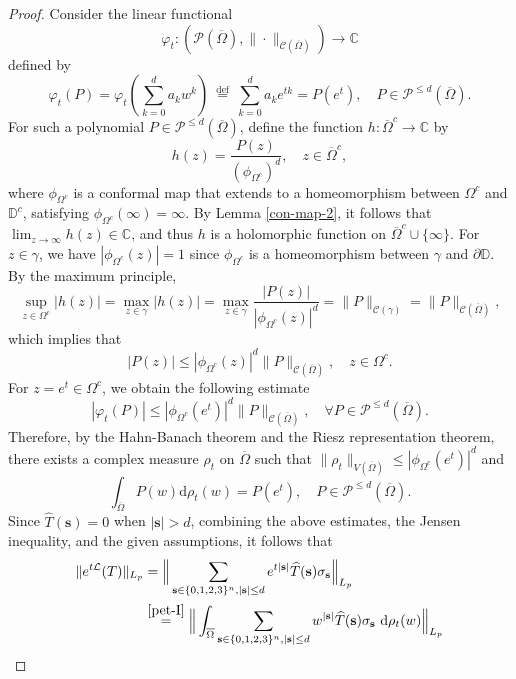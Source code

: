 \documentclass{amsbook}
\theoremstyle{definition}
\theoremstyle{remark}
\numberwithin{section}{chapter}
\numberwithin{equation}{chapter}
\newcommand{\1}{\mathbf{1}}
\begin{document}
\begin{proof} Consider the linear functional
$$\varphi_{t}:(\mathcal{P}(\overline{\Omega}),\|\cdot\|_{\mathcal{C}(\overline{\Omega})}) \rightarrow \mathbb{C}
$$
defined by
$$
\varphi_{t}(P)=\varphi_{t}(\sum_{k=0}^{d} a_{k} w^{k}) \stackrel{\text { def }}{=} \sum_{k=0}^{d} a_{k} e^{t k}=P(e^t),\quad P\in \mathcal{P}^{\leq d}(\overline{\Omega}).
$$
 For such a polynomial $P\in \mathcal{P}^{\leq d}(\overline{\Omega})$, define the function $h:\overline{\Omega}^{c}\rightarrow \mathbb{C}$ by
$$h(z)=\frac{P(z)}{(\phi_{\Omega^c})^d},\quad z\in\overline{\Omega}^{c},$$
where $\phi_{\Omega^{c}}$ is a conformal map that extends to a homeomorphism between $\Omega^{c}$ and $\mathbb{D}^{c}$, satisfying $\phi_{\Omega^{c}}(\infty)=\infty$. By Lemma \ref{con-map-2}, it follows  that $\lim _{z \rightarrow \infty} h(z) \in \mathbb{C}$, and thus $h$ is a holomorphic function on $\overline{\Omega}^{c} \cup\{\infty\}$. For $z \in \gamma$, we have $|\phi_{\Omega^{c}}(z)|=1$ since $\phi_{\Omega^{c}}$ is a homeomorphism between $\gamma$ and $\partial \mathbb{D}$. By the maximum principle,
$$
\sup _{z \in \Omega^{c}}|h(z)|=\max _{z \in \gamma}|h(z)|=\max _{z \in \gamma} \frac{|P(z)|}{|\phi_{\Omega^{c}}(z)|^{d}}=\|P\| _{\mathcal{C}(\gamma)}=\|P\|_{\mathcal{C}(\overline{\Omega})},$$
which implies that 
$$
|P(z)| \leq|\phi_{\Omega^{c}}(z)|^{d}\|P\|_{\mathcal{C}(\overline{\Omega})},\quad z \in \Omega^{c}.
$$
For  $z=e^t\in\Omega^{c}$, we obtain the following estimate
$$
|\varphi_{t}(P)| \leq|\phi_{\Omega^{c}}(e^{t})|^{d}\|P\|_{\mathcal{C}(\overline{\Omega})},\quad \forall P \in \mathcal{P}^{\leq d}(\overline{\Omega}). $$
Therefore, by the Hahn-Banach theorem and the Riesz representation theorem, there exists a complex measure $\rho_{t}$ on $\overline{\Omega}$ such that $\|\rho_{t}\|_{V(\overline{\Omega})} \leq|\phi_{\Omega^{c}}(e^{t})|^{d}$ and
\begin{equation}\label{pet-I}
\int_{\overline{\Omega}} P(w) \mathrm{d}\rho_{t}(w)=P(e^{t}),\quad P \in \mathcal{P}^{\leq d}(\overline{\Omega}). 
\end{equation}
Since $\widehat{T}(\mathbf{s})=0$ when $|\mathbf{s}|>d$, combining the above estimates, the Jensen inequality, and the given assumptions, it follows that
\begin{align*}
\|e^{t \mathcal{L}} (T)\|_{L_{p}} 
&=\Big\|\sum_{\mathbf{s}\in\{0,1,2,3\}^n,|\mathbf{s}|\leq d}e^{t |\mathbf{s}|}\widehat{T}(\mathbf{s}) \sigma_{\mathbf{s}}\Big\|_{L_{p}}\\
&\stackrel{\eqref{pet-I}}{=}\Big\|\int_{\overline{\Omega}}\sum_{\mathbf{s}\in\{0,1,2,3\}^n,|\mathbf{s}|\leq d}w^{|\mathbf{s}|}\widehat{T}(\mathbf{s}) \sigma_{\mathbf{s}}\mathrm{~d} \rho_{t}(w)\Big\|_{L_{p}}\\

\end{align*}
\end{proof}
\end{document}
